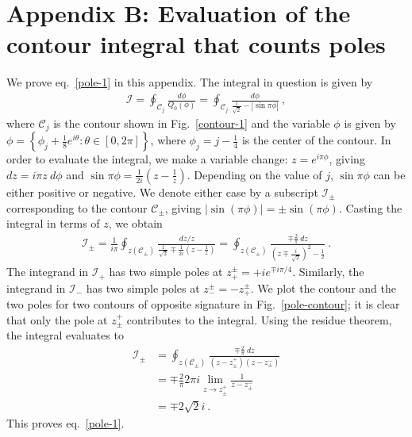 \section*{Appendix B: Evaluation of the contour integral that counts poles}\label{contour-integral}
We prove eq.~\eqref{pole-1} in this appendix. The integral in question is given by
\begin{equation}\label{appcont}\begin{aligned}
	\mathcal{I} = \oint_{\mathcal{C}_j} \frac{d\phi}{Q_0(\phi)} = \oint_{\mathcal{C}_j} \frac{d\phi}{\frac{1}{\sqrt 2} - |\sin\pi\phi|}~,
\end{aligned}\end{equation}
where \(\mathcal{C}_j\) is the contour shown in Fig.~\ref{contour-1} and the variable $\phi$ is given by \(\phi = \left\{\phi_j + \frac{1}{8}e^{i\theta}: \theta \in\left[0,2\pi\right] \right\} \), where \(\phi_j = j - \frac{1}{4}\) is the center of the contour. In order to evaluate the integral, we make a variable change: \(z = e^{i\pi\phi}\), giving \(dz = i\pi z~d\phi\) and \(\sin\pi\phi = \frac{1}{2i}\left( z - \frac{1}{z} \right)\). Depending on the value of \(j\), \(\sin\pi\phi\) can be either positive or negative. We denote either case by a subscript \(\mathcal{I}_\pm\) corresponding to the contour \(\mathcal{C}_\pm\), giving \(|\sin \left(\pi\phi\right)| = \pm \sin \left(\pi\phi\right)\).
Casting the integral in terms of \(z\), we obtain
\begin{equation}\begin{aligned}
	\mathcal{I}_\pm = \frac{1}{i \pi}\oint_{z\left(\mathcal{C}_\pm\right)} \frac{d z/z}{\frac{1}{\sqrt 2} \mp \frac{1}{2i}\left( z - \frac{1}{z} \right) } = \oint_{z\left(\mathcal{C}_\pm\right)} \frac{\mp \frac{2}{\pi}~d z}{\left( z\mp \frac{i}{\sqrt 2} \right) ^2 - \frac{1}{2}}~.
\end{aligned}\end{equation}
The integrand in \(\mathcal{I}_+\) has two simple poles at \(z_+^\pm = +ie^{\mp i \pi/4} \).
Similarly, the integrand in \(\mathcal{I}_-\) has two simple poles at \(z_-^\pm = -z_+^\pm\).
We plot the contour and the two poles for two contours of opposite signature in Fig.~\ref{pole-contour}; it is clear that only the pole at \(z^+_\pm\) contributes to the integral. Using the residue theorem, the integral evaluates to
\begin{equation}\begin{aligned}
	\mathcal{I}_\pm &= \oint_{z\left(\mathcal{C}_\pm\right)} \frac{\mp \frac{2}{\pi}~d z}{\left(z - z^+_\pm\right)\left(z - z^-_\pm\right)} \\
			&= \mp \frac{2}{\pi}2\pi i \lim_{z \to z^+_\pm} \frac{1}{z - z^-_\pm} \\
			&= \mp 2\sqrt 2 i~.
\end{aligned}\end{equation}
This proves eq.~\eqref{pole-1}.
